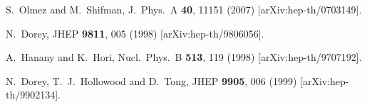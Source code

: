 \documentclass[12pt]{article}
\begin{document}
\begin{thebibliography}{99}
  S.~Olmez and M.~Shifman,
  J.\ Phys.\ A  {\bf 40}, 11151 (2007)
  [arXiv:hep-th/0703149].

  N.~Dorey,
  JHEP {\bf 9811}, 005 (1998)
  [arXiv:hep-th/9806056].

  A.~Hanany and K.~Hori,
  Nucl.\ Phys.\  B {\bf 513}, 119 (1998)
  [arXiv:hep-th/9707192].

  N.~Dorey, T.~J.~Hollowood and D.~Tong,
  JHEP {\bf 9905}, 006 (1999)
  [arXiv:hep-th/9902134].

\end{thebibliography}
\end{document}
